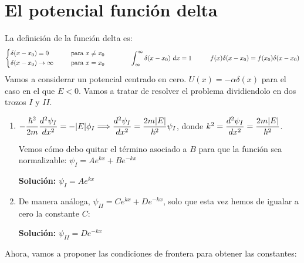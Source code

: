 \documentclass{report}
\begin{document}
  \section{El potencial función delta}
    \noindent La definición de la función delta es:
    \[\begin{cases}
      \begin{aligned}
        &\delta(x-x_0)=0                &\hspace{0.6cm}\text{para }x\neq x_0\\
        &\delta(x-x_0)\rightarrow\infty &\hspace{0.6cm}\text{para }x=x_0
      \end{aligned}
    \end{cases}\hspace{1cm}\displaystyle\int_{\infty}^{\infty}\delta(x-x_0)\ dx=1
    \hspace{1cm}f(x)\delta(x-x_0)=f(x_0)\delta(x-x_0)\]
    Vamos a considerar un potencial centrado en cero. $U(x)=-\alpha \delta(x)$ para el 
    caso en el que $E<0$. Vamos a tratar de resolver el problema dividiendolo en dos 
    trozos $I$ y $II$. 
    \begin{enumerate}
      \item $-\dfrac{\hbar^2}{2m}\dfrac{d^2\psi_I}{dx^2}=-\lvert E\rvert\phi_I\Longrightarrow
            \dfrac{d^2\psi_I}{dx^2}=\dfrac{2m\lvert E\rvert}{\hbar^2}\psi_I$, donde 
            $k^2=\dfrac{d^2\psi_I}{dx^2}=\dfrac{2m\lvert E\rvert}{\hbar^2}$.

            Vemos cómo debo quitar el término asociado a $B$ para que la función sea 
            normalizable: $\psi_I=Ae^{kx}+Be^{-kx}$

            \textbf{Solución: }$\psi_{I}=Ae^{kx}$
      \item De manera análoga, $\psi_{II}=Ce^{kx}+De^{-kx}$, solo que esta vez
            hemos de igualar a cero la constante $C$:

            \textbf{Solución: }$\psi_{II}=De^{-kx}$
    \end{enumerate}
    Ahora, vamos a proponer las condiciones de frontera para obtener las constantes:
\end{document}
